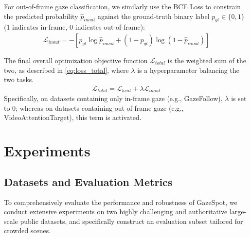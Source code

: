 \documentclass[sigconf,review,anonymous,screen]{acmart}
\begin{document}
For out-of-frame gaze classification, we similarly use the BCE Loss to constrain the predicted probability $\hat{p}_{inout}$ against the ground-truth binary label $p_{gt} \in \{0, 1\}$ ($1$ indicates in-frame, $0$ indicates out-of-frame):
\begin{equation}
\label{eq:loss_inout}
    \begin{aligned}
    \mathcal{L}_{inout} = -\left[ p_{gt} \log \hat{p}_{inout} + (1 - p_{gt}) \log (1 - \hat{p}_{inout}) \right]
    \end{aligned}
\end{equation}

The final overall optimization objective function $\mathcal{L}_{total}$ is the weighted sum of the two, as described in \autoref{eq:loss_total}, where $\lambda$ is a hyperparameter balancing the two tasks.
\begin{equation}
\label{eq:loss_total}
    \begin{aligned}
    \mathcal{L}_{total} = \mathcal{L}_{heat} + \lambda \mathcal{L}_{inout}
    \end{aligned}
\end{equation}
Specifically, on datasets containing only in-frame gaze (e.g., GazeFollow), $\lambda$ is set to $0$; whereas on datasets containing out-of-frame gaze (e.g., VideoAttentionTarget), this term is activated.

\section{Experiments}
\label{sec:experiments}

\subsection{Datasets and Evaluation Metrics}
To comprehensively evaluate the performance and robustness of GazeSpot, we conduct extensive experiments on two highly challenging and authoritative large-scale public datasets, and specifically construct an evaluation subset tailored for crowded scenes.
\end{document}
